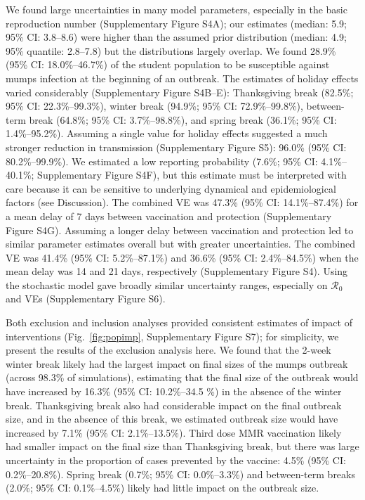 \documentclass[12pt]{article}
\newcommand{\fref}[1]{Fig.~\ref{fig:#1}}
\begin{document}
We found large uncertainties in many model parameters, especially in the basic reproduction number (Supplementary Figure S4A); our estimates (median: 5.9; 95\% CI: 3.8--8.6) were higher than the assumed prior distribution (median: 4.9; 95\% quantile: 2.8--7.8) but the distributions largely overlap.
We found 28.9\% (95\% CI: 18.0\%--46.7\%) of the student population to be susceptible against mumps infection at the beginning of an outbreak.
The estimates of holiday effects varied considerably (Supplementary Figure S4B--E): Thanksgiving break (82.5\%; 95\% CI: 22.3\%--99.3\%), winter break (94.9\%; 95\% CI: 72.9\%--99.8\%), between-term break (64.8\%; 95\% CI: 3.7\%--98.8\%), and spring break (36.1\%; 95\% CI: 1.4\%--95.2\%). 
Assuming a single value for holiday effects suggested a much stronger reduction in transmission (Supplementary Figure S5): 96.0\% (95\% CI: 80.2\%--99.9\%).
We estimated a low reporting probability (7.6\%; 95\% CI: 4.1\%--40.1\%; Supplementary Figure S4F), but this estimate must be interpreted with care because it can be sensitive to underlying dynamical and epidemiological factors (see Discussion).
The combined VE was 47.3\% (95\% CI: 14.1\%--87.4\%) for a mean delay of 7 days between vaccination and protection (Supplementary Figure S4G). 
Assuming a longer delay between vaccination and protection led to similar parameter estimates overall but with greater uncertainties.
The combined VE was 41.4\% (95\% CI: 5.2\%--87.1\%) and 36.6\% (95\% CI: 2.4\%--84.5\%) when the mean delay was 14 and 21 days, respectively (Supplementary Figure S4).
Using the stochastic model gave broadly similar uncertainty ranges, especially on $\mathcal R_0$ and VEs (Supplementary Figure S6).

Both exclusion and inclusion analyses provided consistent estimates of impact of interventions (\fref{popimp}, Supplementary Figure S7); for simplicity, we present the results of the exclusion analysis here.
We found that the 2-week winter break likely had the largest impact on final sizes of the mumps outbreak (across 98.3\% of simulations), estimating that the final size of the outbreak would have increased by 16.3\% (95\% CI: 10.2\%--34.5 \%) in the absence of the winter break.
Thanksgiving break also had considerable impact on the final outbreak size, and in the absence of this break, we estimated outbreak size would have increased by 7.1\% (95\% CI: 2.1\%--13.5\%).
Third dose MMR vaccination likely had smaller impact on the final size than Thanksgiving break, but there was large uncertainty in the proportion of cases prevented by the vaccine: 4.5\% (95\% CI: 0.2\%--20.8\%).
Spring break (0.7\%; 95\% CI: 0.0\%--3.3\%) and between-term breaks (2.0\%; 95\% CI: 0.1\%--4.5\%) likely had little impact on the outbreak size.
\end{document}
